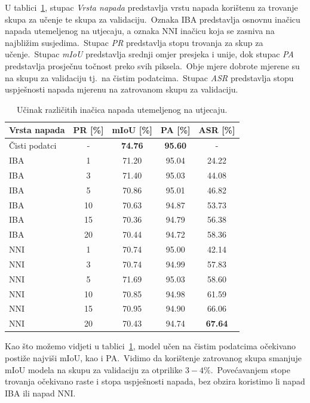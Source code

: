 \documentclass[times, utf8, seminar, numeric]{fer}
\begin{document}
U tablici~\ref{tbl:performanse_iba}, stupac \textit{Vrsta napada} predstavlja vrstu napada korištenu za trovanje skupa za učenje te skupa za validaciju.\ 
Oznaka IBA predstavlja osnovnu inačicu napada utemeljenog na utjecaju, a oznaka NNI inačicu koja se zasniva na najbližim susjedima.\ 
Stupac \textit{PR} predstavlja stopu trovanja za skup za učenje.\ Stupac \textit{mIoU} predstavlja srednji omjer presjeka i unije, dok stupac \textit{PA} predstavlja prosječnu točnost preko svih piksela.\ 
Obje mjere dobrote mjerene su na skupu za validaciju tj.\ na čistim podatcima.\  Stupac \textit{ASR} predstavlja stopu uspješnosti napada mjerenu na zatrovanom skupu za validaciju.\

\begin{table}[htb]
    \caption{Učinak različitih inačica napada utemeljenog na utjecaju.}
    \label{tbl:performanse_iba}
    \centering
    \begin{tabular}{lcccc} \hline
    Vrsta napada & PR [\%] & mIoU [\%] & PA [\%] & ASR [\%] \\ \hline
    Čisti podatci & - & \textbf{74.76} & \textbf{95.60} & - \\ \hline
    IBA & 1 & 71.20 & 95.04 & 24.22 \\
    IBA & 3 & 71.40 & 95.03 & 44.08 \\
    IBA & 5 & 70.86 & 95.01 & 46.82 \\
    IBA & 10 & 70.63 & 94.87 & 53.73 \\
    IBA & 15 & 70.36 & 94.79 & 56.38 \\
    IBA & 20 & 70.44 & 94.72 & 58.36 \\ \hline
    NNI & 1 & 70.74 & 95.00 & 42.14 \\
    NNI & 3 & 70.74 & 94.99 & 57.83 \\ 
    NNI & 5 & 71.69 & 95.03 & 58.60 \\ 
    NNI & 10 & 70.85 & 94.98 & 61.59 \\
    NNI & 15 & 70.95 & 94.90 & 66.06 \\
    NNI & 20 & 70.43 & 94.74 & \textbf{67.64} \\ \hline
    \end{tabular}
\end{table}

Kao što možemo vidjeti u tablici~\ref{tbl:performanse_iba}, model učen na čistim podatcima očekivano postiže najviši mIoU, kao i PA.\ 
Vidimo da korištenje zatrovanog skupa smanjuje mIoU modela na skupu za validaciju za otprilike $3-4\%$.\
Povećavanjem stope trovanja očekivano raste i stopa uspješnosti napada, bez obzira koristimo li napad IBA ili napad NNI.\ 
\end{document}

